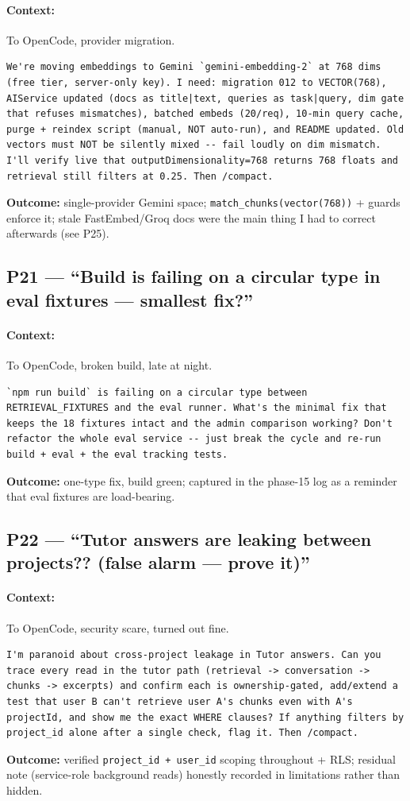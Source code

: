 \documentclass[11pt,a4paper]{article}
\begin{document}
\paragraph{Context:} To OpenCode, provider migration.
\begin{lstlisting}
We're moving embeddings to Gemini `gemini-embedding-2` at 768 dims (free tier, server-only key). I need: migration 012 to VECTOR(768), AIService updated (docs as title|text, queries as task|query, dim gate that refuses mismatches), batched embeds (20/req), 10-min query cache, purge + reindex script (manual, NOT auto-run), and README updated. Old vectors must NOT be silently mixed -- fail loudly on dim mismatch. I'll verify live that outputDimensionality=768 returns 768 floats and retrieval still filters at 0.25. Then /compact.
\end{lstlisting}
\textbf{Outcome:} single-provider Gemini space; \texttt{match\_chunks(vector(768))} + guards enforce it; stale FastEmbed/Groq docs were the main thing I had to correct afterwards (see P25).

\subsection{P21 --- ``Build is failing on a circular type in eval fixtures --- smallest fix?''}
\paragraph{Context:} To OpenCode, broken build, late at night.
\begin{lstlisting}
`npm run build` is failing on a circular type between RETRIEVAL_FIXTURES and the eval runner. What's the minimal fix that keeps the 18 fixtures intact and the admin comparison working? Don't refactor the whole eval service -- just break the cycle and re-run build + eval + the eval tracking tests.
\end{lstlisting}
\textbf{Outcome:} one-type fix, build green; captured in the phase-15 log as a reminder that eval fixtures are load-bearing.

\subsection{P22 --- ``Tutor answers are leaking between projects?? (false alarm --- prove it)''}
\paragraph{Context:} To OpenCode, security scare, turned out fine.
\begin{lstlisting}
I'm paranoid about cross-project leakage in Tutor answers. Can you trace every read in the tutor path (retrieval -> conversation -> chunks -> excerpts) and confirm each is ownership-gated, add/extend a test that user B can't retrieve user A's chunks even with A's projectId, and show me the exact WHERE clauses? If anything filters by project_id alone after a single check, flag it. Then /compact.
\end{lstlisting}
\textbf{Outcome:} verified \texttt{project\_id + user\_id} scoping throughout + RLS; residual note (service-role background reads) honestly recorded in limitations rather than hidden.
\end{document}

